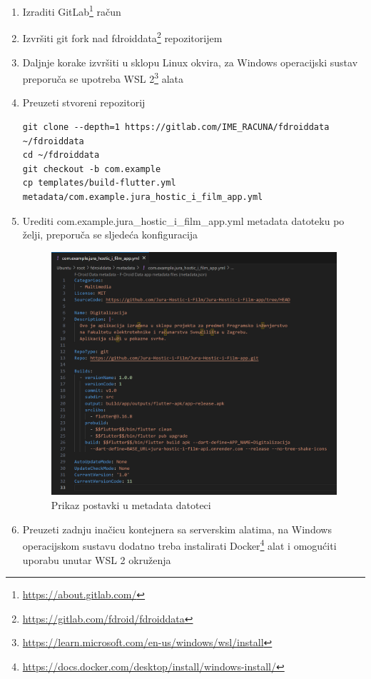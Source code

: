 			\begin{enumerate}
				\item{Izraditi GitLab\footnote{\url{https://about.gitlab.com/}} račun}
				\item{Izvršiti git fork nad fdroiddata\footnote{\url{https://gitlab.com/fdroid/fdroiddata}} repozitorijem}
				\item{Daljnje korake izvršiti u sklopu Linux okvira, za Windows operacijski sustav preporuča se upotreba WSL 2\footnote{\url{https://learn.microsoft.com/en-us/windows/wsl/install}} alata}
				\item{Preuzeti stvoreni repozitorij}
				\begin{verbatim}
git clone --depth=1 https://gitlab.com/IME_RACUNA/fdroiddata ~/fdroiddata
cd ~/fdroiddata
git checkout -b com.example
cp templates/build-flutter.yml metadata/com.example.jura_hostic_i_film_app.yml
				\end{verbatim}
				\item{Urediti com.example.jura\_hostic\_i\_film\_app.yml metadata datoteku po želji, preporuča se sljedeća konfiguracija}
				\begin{figure}[H]
					\includegraphics[width=\textwidth]{slike/metadata.png}
					\caption{Prikaz postavki u metadata datoteci}
					\label{fig:metadataPostavke}
				\end{figure}
				\item{Preuzeti zadnju inačicu kontejnera sa serverskim alatima, na Windows operacijskom sustavu dodatno treba instalirati Docker\footnote{\url{https://docs.docker.com/desktop/install/windows-install/}} alat i omogućiti uporabu unutar WSL 2 okruženja}

\end{enumerate}
